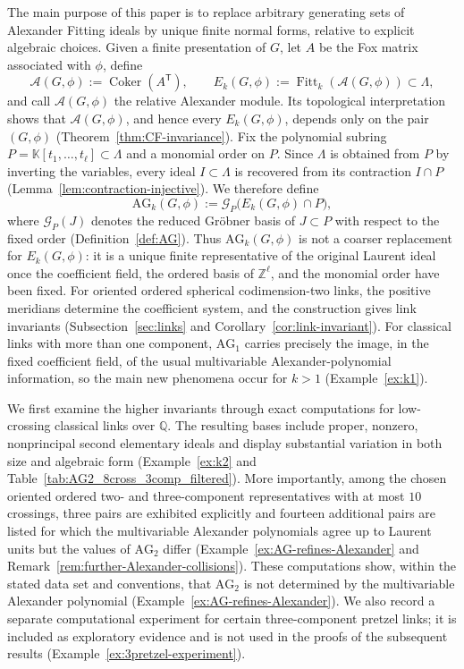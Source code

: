 \documentclass{article}
\theoremstyle{definition}
\theoremstyle{plain}
\def\Coker{\mathop{\mathrm{Coker}}\nolimits}
\newcommand{\Q}{{\mathbb{Q}}}
\newcommand{\AG}{\mathrm{AG}}
\newcommand{\Z}{\mathbb{Z}}
\newcommand{\K}{\mathbb{K}}
\newcommand{\Fitt}{\operatorname{Fitt}}
\begin{document}
The main purpose of this paper is to replace arbitrary generating sets of
Alexander Fitting ideals by unique finite normal forms, relative to
explicit algebraic choices.  Given a finite presentation of \(G\), let \(A\) be the
Fox matrix associated with \(\phi\), define
\[
 \mathcal A(G,\phi):=\Coker(A^{\mathsf T}),
 \qquad
 E_k(G,\phi):=\Fitt_k(\mathcal A(G,\phi))\subset\Lambda,
\]
and call \(\mathcal A(G,\phi)\) the relative Alexander module.  Its
topological interpretation shows that \(\mathcal A(G,\phi)\), and hence
every \(E_k(G,\phi)\), depends only on the pair \((G,\phi)\)
(Theorem~\ref{thm:CF-invariance}).  Fix the polynomial subring
$
 P=\K[t_1,\dots,t_\ell]\subset\Lambda
$
and a monomial order on \(P\).  Since \(\Lambda\) is obtained from \(P\)
by inverting the variables, every ideal \(I\subset\Lambda\) is recovered
from its contraction \(I\cap P\) (Lemma~\ref{lem:contraction-injective}).
We therefore define
\[
 \AG_k(G,\phi)
 :=\mathcal G_P\bigl(E_k(G,\phi)\cap P\bigr),
\]
where \(\mathcal G_P(J)\) denotes the reduced Gr\"obner basis of
\(J\subset P\) with respect to the fixed order
(Definition~\ref{def:AG}).  Thus \(\AG_k(G,\phi)\) is not a coarser replacement for
\(E_k(G,\phi)\): it is a unique finite representative of the original
Laurent ideal once the coefficient field, the ordered basis of
\(\Z^\ell\), and the monomial order have been fixed.  For oriented ordered
spherical codimension-two links, the positive meridians determine the
coefficient system, and the construction gives link invariants
(Subsection~\ref{sec:links} and
Corollary~\ref{cor:link-invariant}).  
For classical links with more than one component, \(\AG_1\) carries
precisely the image, in the fixed coefficient field, of the usual
multivariable Alexander-polynomial information, so the main new phenomena occur for
\(k>1\) (Example~\ref{ex:k1}).


We first examine the higher invariants through exact computations for
low-crossing classical links over \(\Q\).  The resulting bases include
proper, nonzero, nonprincipal second elementary ideals and display
substantial variation in both size and algebraic form
(Example~\ref{ex:k2} and
Table~\ref{tab:AG2_8cross_3comp_filtered}).  More importantly, among the
chosen oriented ordered two- and three-component representatives with at
most \(10\) crossings, three pairs are exhibited explicitly and fourteen
additional pairs are listed for which the multivariable Alexander
polynomials agree up to Laurent units but the values of \(\AG_2\) differ
(Example~\ref{ex:AG-refines-Alexander} and
Remark~\ref{rem:further-Alexander-collisions}).  
These computations show,
within the stated data set and conventions, that \(\AG_2\) is not
determined by the multivariable Alexander polynomial
(Example~\ref{ex:AG-refines-Alexander}).  We also record a separate
computational experiment for certain three-component pretzel
links; it is included as exploratory evidence and is not used in the
proofs of the subsequent results
(Example~\ref{ex:3pretzel-experiment}).
\end{document}
